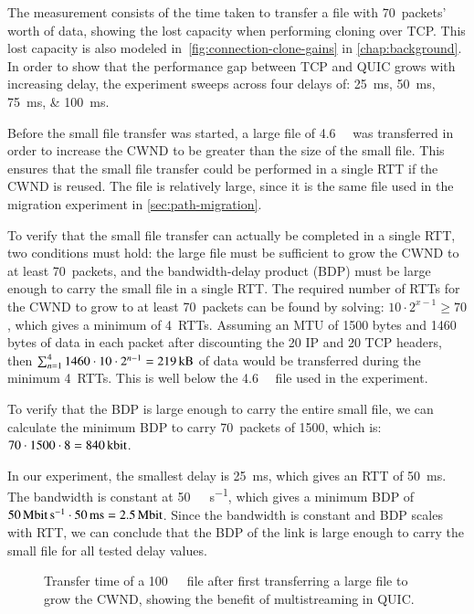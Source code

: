 The measurement consists of the time taken to transfer a file with 70~packets'
worth of data, showing the lost capacity when performing cloning
over TCP. This lost capacity is also modeled in~\cref{fig:connection-clone-gains} in 
\cref{chap:background}.
In order to show that the performance gap between TCP and QUIC grows with increasing delay,
the experiment sweeps across four delays of:
\qtylist{25;50;75;100}{\milli\second}.

Before the small file transfer was started, a large file of \qty{4.6}{\mega\byte} was
transferred in order to increase the CWND to be greater than the size of the small file.
This ensures that the small file transfer could be performed in a single RTT if the
CWND is reused. The file is relatively large, since it is the same
file used in the migration experiment in \cref{sec:path-migration}.

To verify that the small file transfer can actually be completed in
a single RTT, two conditions must hold: the large file must be sufficient
to grow the CWND to at least 70~packets, and the bandwidth-delay product (BDP) must be large
enough to carry the small file in a single RTT.
The required number of RTTs for the CWND to grow to at least  70~packets
can be found by solving: $10 \cdot 2^{x-1} \geq 70$, which gives
a minimum of 4~RTTs.
Assuming an MTU of 1500 bytes and 1460 bytes of data in each packet after discounting
the \qty{20}{\Byte} IP and \qty{20}{\Byte} TCP headers, then
$\sum_{n=1}^{4} 1460 \cdot 10 \cdot 2^{n-1} = \qty{219}{\kilo\byte}$ of data would
be transferred during the minimum 4~RTTs.
This is well below the \qty{4.6}{\mega\byte} file used in the experiment.

To verify that the BDP is large enough to carry the entire small file,
we can calculate the minimum BDP to carry 70~packets of \qty{1500}{\Bytes}, which is:
$70 \cdot 1500 \cdot 8 = \qty{840}{\kilo\bit}$.

In our experiment, the smallest delay is \qty{25}{\milli\second},
which gives an RTT of \qty{50}{\milli\second}.
The bandwidth is constant at \qty{50}{\mega\bit\per\second}, which gives a minimum BDP of
$\qty{50}{\mega\bit\per\second} \cdot \qty{50}{\milli\second} = \qty{2.5}{\mega\bit}$.
Since the bandwidth is constant and BDP scales
with RTT, we can conclude that the BDP of the link is large enough
to carry the small file for all tested delay values.

\begin{figure}[H]
  
  \caption[Small file transfer experiment]{Transfer time of a \qty{100}{\kilo\byte}~file after first transferring a large file to grow the CWND, showing the benefit of multistreaming in QUIC.}
  \label{fig:small-file-bar}
\end{figure}

